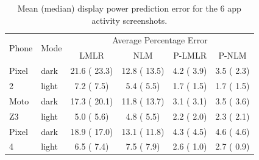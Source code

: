 \begin{table}[tp]
\begin{center}
\centering
\caption{Mean (median) display power prediction error for the 6 app activity screenshots.}
\vspace{-0.1in}
{ \footnotesize
    \begin{tabular}{|p{7mm}|p{6mm}|c|c|c|c|}
    	\hline
    	       \multirow{2}{*}{Phone} & \multirow{2}{*}{Mode} & \multicolumn{4}{c|}{Average Percentage Error} \\
    	\cline{3-6}
    	        &   & LMLR & NLM & P-LMLR & P-NLM\\
    	\hline
    	Pixel & dark   & 21.6 ( 23.3) & 12.8 ( 13.5) & 4.2 ( 3.9) & 3.5 ( 2.3) \\ %
    	    2 & light  & 7.2 ( 7.5) & 5.4 ( 5.5) & 1.7 ( 1.5) & 1.7 ( 1.5) \\
    	\hline
    	Moto  & dark   & 17.3 ( 20.1) & 11.8 ( 13.7) & 3.1 ( 3.1) & 3.5 ( 3.6) \\ %
           Z3 & light  & 5.0 ( 5.6) & 4.8 ( 5.5) & 2.2 ( 2.0) & 2.3 ( 2.1) \\
    	\hline
        Pixel & dark   & 18.9 ( 17.0) & 13.1 ( 11.8) & 4.3 ( 4.5) & 4.6 ( 4.6) \\ %
            4 & light  & 6.5 ( 7.4) & 7.5 ( 7.9) & 2.6 ( 1.0) & 2.7 ( 0.9) \\
    	\hline
    \end{tabular}
}
\label{tab:100_images}
\end{center}
\vspace{-0.2in}
\end{table}

